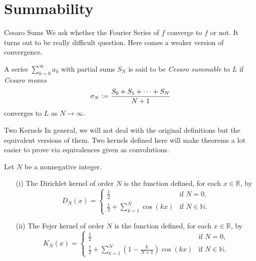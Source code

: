 \documentclass{beamer}
\begin{document}
\section{Summability}




\begin{frame}{Cesaro Sums}
    We ask whether the Fourier Series of $f$ converge to $f$ or not. It turns out to be really difficult question. Here comes a weaker version of convergence.
    \begin{definition}
        A series $\sum_{k=0}^{\infty} a_k$ with partial sums $S_N$ is said to be \textit{Cesaro summable} to $L$ if \textit{Cesaro means}
    \[
    \sigma_N \vcentcolon =  \frac{S_0 + S_1 + \dots + S_N }{N+1}
    \]
    converges to $L$ as $N \longrightarrow \infty$.
    \end{definition}
\end{frame}




    \begin{frame}{Two Kernels}
    \small
    In general, we will not deal with the original definitions but the equivalent versions of them. Two kernels defined here will make theorems a lot easier to prove via equivalences given as convolutions.
    \begin{definition}[Kernels]
        Let $N$ be a nonnegative integer.
\begin{enumerate}
  \item[(i)] The Dirichlet kernel of order $N$ is the function defined, for each $x \in \mathbb{R}$, by
  \[
  D_N(x) = \begin{cases}
            \frac{1}{2} & \text{if } N = 0, \\
            \frac{1}{2}  + \sum_{k=1}^{N} \cos(kx) & \text{if } N \in \mathbb{N}.
           \end{cases}
  \]
  
  \item[(ii)] The Fejer kernel of order $N$ is the function defined, for each $x \in \mathbb{R}$, by
  \[
  K_N(x) = \begin{cases}
            \frac{1}{2} & \text{if } N = 0, \\
            \frac{1}{2} + \sum_{k=1}^{N}\left( 1 - \frac{k}{N + 1} \right)\cos(kx) & \text{if } N \in \mathbb{N}.
           \end{cases}
  \]
\end{enumerate}
    \end{definition}

\end{frame}
\end{document}
